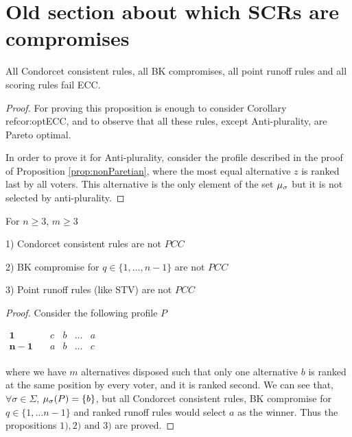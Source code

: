\documentclass[version=3.21, pagesize, twoside=off, bibliography=totoc, DIV=calc, fontsize=12pt, a4paper]{scrartcl}
\begin{document}
\section{Old section about which SCRs are compromises}
\begin{proposition}
	All Condorcet consistent rules, all BK compromises, all point runoff rules and all scoring rules fail ECC.
\end{proposition}
\begin{proof}
	For proving this proposition is enough to consider Corollary ref{cor:optECC}, and to observe that all these rules, except Anti-plurality, are Pareto optimal.
	
	In order to prove it for Anti-plurality, consider the profile described in the proof of Proposition \ref{prop:nonParetian}, where the most equal alternative $z$ is ranked last by all voters. This alternative is the only element of the set $\mu_{\sigma}$ but it is not selected by anti-plurality. %
\end{proof}

\begin{proposition} For $n\geq3$, $m\geq3$  \label{prop:rulesnotPCC}
	\begin{item}
		\item[1)] Condorcet consistent rules are not $PCC$
		\item[2)] BK compromise for $q \in \{1, \dots ,n-1\}$ are not $PCC$
		\item[3)] Point runoff rules (like STV) are not $PCC$
	\end{item}
\end{proposition}
\begin{proof}
	Consider the following profile $P$
	\begin{center}
		$
		\begin{array}{ccccc}
		\mathbf{1} \quad &c&b&\dots &a\\
		\mathbf{n-1} \quad &a&b&\dots &c\\		
		\end{array}
		$
	\end{center}
	where we have $m$ alternatives disposed such that only one alternative $b$ is ranked at the same position by every voter, and it is ranked second.
	We can see that, $\forall \sigma \in \Sigma$, $\mu_{\sigma}(P)=\{b\}$, but all Condorcet consistent rules, BK compromise for $q \in \{1, \dots n-1\}$ and ranked runoff rules would select $a$ as the winner. Thus the propositions $1), 2) \text{ and } 3)$ are proved. 
\end{proof}
\end{document}
